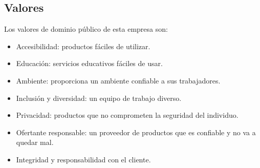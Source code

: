 \documentclass{article}
\begin{document}
\subsection{Valores}

Los valores de dominio público de esta empresa son: 
\begin{itemize}
    \item Accesibilidad: productos fáciles de utilizar.
    \item Educación: servicios educativos fáciles de usar.
    \item Ambiente: proporciona un ambiente confiable a sus trabajadores.
    \item Inclusión y diversidad: un equipo de trabajo diverso.
    \item Privacidad: productos que no comprometen la seguridad del individuo.
    \item Ofertante responsable: un proveedor de productos que es confiable y no va a quedar mal.
    \item Integridad y responsabilidad con el cliente.
\end{itemize}
\end{document}
